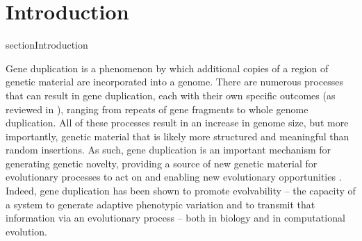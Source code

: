 \section{Introduction} \label{sec:introduction}

section{Introduction}

Gene duplication is a phenomenon by which
additional copies of a region of genetic material
are incorporated into a genome.
There are numerous processes that can result in gene duplication, each with their own specific outcomes (as reviewed in \citep{Zhang:2003fw}), ranging from repeats of gene fragments to whole genome duplication.  All of these processes result in %
an increase in genome size, but more importantly, genetic material that is likely more structured and meaningful than random insertions. %
As such, gene duplication is an important mechanism for generating genetic novelty, providing a source of new genetic material for evolutionary processes to act on and enabling new evolutionary opportunities \citep{Zhang:2003fw,Crow:2006role,Magadum:2013wu}. Indeed, gene duplication has been shown to promote evolvability -- the capacity of a system to generate adaptive phenotypic variation %
and to transmit that information via an evolutionary process \citep{Hu:2010ea} -- both in biology and in computational evolution.  %

